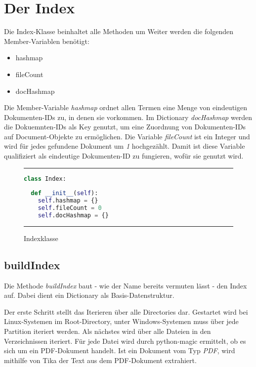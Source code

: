 \section{Der Index}\label{der-index}

Die Index-Klasse beinhaltet alle Methoden um 
Weiter werden die folgenden Member-Variablen benötigt:

\begin{itemize}
	\item hashmap
	\item fileCount
	\item docHashmap
\end{itemize}

Die Member-Variable \emph{hashmap} ordnet allen Termen eine Menge von eindeutigen Dokumenten-IDs zu, in denen sie vorkommen. Im Dictionary \emph{docHashmap} werden die Dokuemnten-IDs als Key genutzt, um eine Zuordnung von Dokumenten-IDs auf Document-Objekte zu ermöglichen. Die Variable \emph{fileCount} ist ein Integer und wird für jedes gefundene Dokument um \emph{1} hochgezählt. Damit ist diese Variable qualifiziert als eindeutige Dokumenten-ID zu fungieren, wofür sie genutzt wird.

\begin{figure}[h]
	\rule{\textwidth}{0.4pt}
		\begin{lstlisting}[language=Python]
class Index:
  
  def __init__(self):
    self.hashmap = {}
    self.fileCount = 0
    self.docHashmap = {}
		\end{lstlisting}
	\rule{\textwidth}{0.4pt}
	\caption{Indexklasse}
	\label{fig:index}
\end{figure}

\subsection{buildIndex}\label{buildindex}

Die Methode \emph{buildIndex} baut - wie der Name bereits vermuten lässt - den Index auf. Dabei dient ein Dictionary als Basis-Datenstruktur.

Der erste Schritt stellt das Iterieren über alle Directories dar. Gestartet wird bei Linux-Systemen im Root-Directory, unter Windows-Systemen muss über jede Partition iteriert werden. Als nächstes wird über alle Dateien in den Verzeichnissen iteriert. Für jede Datei wird durch python-magic ermittelt, ob es sich um ein PDF-Dokument handelt. Ist ein Dokument vom Typ \emph{PDF}, wird mithilfe von Tika der Text aus dem PDF-Dokument extrahiert.

